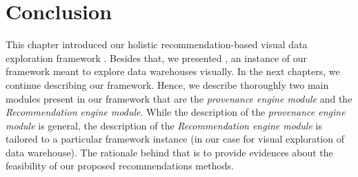 \section{Conclusion}
This chapter introduced our holistic recommendation-based visual data exploration framework \framework{}. Besides that, we presented \prototype{}, an instance of our framework meant to explore data warehouses visually. 
In the next chapters, we continue describing our framework. Hence, we describe thoroughly two main modules present in our framework that are the \emph{provenance engine module} and the \emph{Recommendation engine module}. 
While the description of the \emph{provenance engine module} is general, the description of the \emph{Recommendation engine module} is tailored to a particular framework instance (in our case \prototype{} for visual exploration of data warehouse). The rationale behind that is to provide evidences about the feasibility of our proposed recommendations methods.







